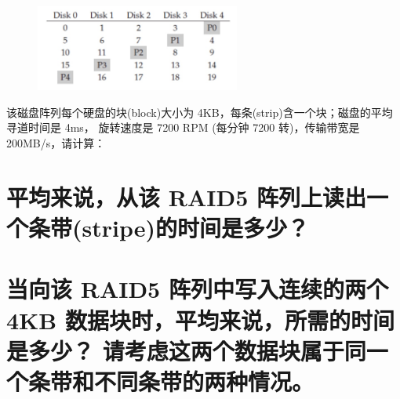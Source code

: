 
\begin{figure}[H]
    \centering
    \includegraphics[width=0.6\textwidth]{img/q1.png}
\end{figure}

该磁盘阵列每个硬盘的块(block)大小为 4KB，每条(strip)含一个块；磁盘的平均寻道时间是 4ms，
旋转速度是 7200 RPM (每分钟 7200 转)，传输带宽是 200MB/s，请计算：

\begin{parts}
    \part {
        平均来说，从该 RAID5 阵列上读出一个条带(stripe)的时间是多少？
    }
    \part {
        当向该 RAID5 阵列中写入连续的两个 4KB 数据块时，平均来说，所需的时间是多少？
        请考虑这两个数据块属于同一个条带和不同条带的两种情况。
    }
\end{parts}


